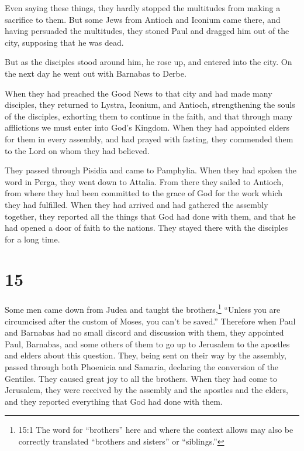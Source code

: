  Even saying these things, they hardly stopped the
multitudes from making a sacrifice to them.  But some Jews
from Antioch and Iconium came there, and having persuaded the
multitudes, they stoned Paul and dragged him out of the city, supposing
that he was dead.

 But as the disciples stood around him, he rose up, and
entered into the city. On the next day he went out with Barnabas to
Derbe.

 When they had preached the Good News to that city and had
made many disciples, they returned to Lystra, Iconium, and Antioch,
 strengthening the souls of the disciples, exhorting them
to continue in the faith, and that through many afflictions we must
enter into God's Kingdom.  When they had appointed elders
for them in every assembly, and had prayed with fasting, they commended
them to the Lord on whom they had believed.

 They passed through Pisidia and came to Pamphylia.
 When they had spoken the word in Perga, they went down to
Attalia.  From there they sailed to Antioch, from where
they had been committed to the grace of God for the work which they had
fulfilled.  When they had arrived and had gathered the
assembly together, they reported all the things that God had done with
them, and that he had opened a door of faith to the nations.
 They stayed there with the disciples for a long time.

\hypertarget{section-14}{%
\section{15}\label{section-14}}

 Some men came down from Judea and taught the
brothers,\footnote{15:1 The word for ``brothers'' here and where the
  context allows may also be correctly translated ``brothers and
  sisters'' or ``siblings.''} ``Unless you are circumcised after the
custom of Moses, you can't be saved.''  Therefore when Paul
and Barnabas had no small discord and discussion with them, they
appointed Paul, Barnabas, and some others of them to go up to Jerusalem
to the apostles and elders about this question.  They, being
sent on their way by the assembly, passed through both Phoenicia and
Samaria, declaring the conversion of the Gentiles. They caused great joy
to all the brothers.  When they had come to Jerusalem, they
were received by the assembly and the apostles and the elders, and they
reported everything that God had done with them.


